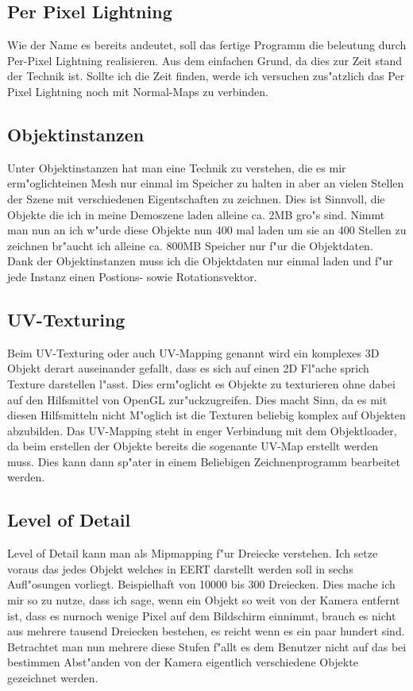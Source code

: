 \documentclass[a4paper,titlepage]{article}
\begin{document}
\subsection{Per Pixel Lightning}
Wie der Name es bereits andeutet, soll das fertige Programm die beleutung durch Per-Pixel Lightning realisieren. Aus dem einfachen Grund, da dies zur Zeit stand der Technik ist. Sollte ich die Zeit finden, werde ich versuchen zus"atzlich das Per Pixel Lightning noch mit Normal-Maps zu verbinden.

\subsection{Objektinstanzen}
Unter Objektinstanzen hat man eine Technik zu verstehen, die es mir erm"oglichteinen Mesh nur einmal im Speicher zu halten in aber an vielen Stellen der Szene mit verschiedenen Eigentschaften zu zeichnen. Dies ist Sinnvoll, die Objekte die ich in meine Demoszene laden alleine ca. 2MB gro"s sind. Nimmt man nun an ich w"urde diese Objekte nun 400 mal laden um sie an 400 Stellen zu zeichnen br"aucht ich alleine ca. 800MB Speicher nur f"ur die Objektdaten.\\
Dank der Objektinstanzen muss ich die Objektdaten nur einmal laden und f"ur jede Instanz einen Postions- sowie Rotationsvektor.

\subsection{UV-Texturing}
Beim UV-Texturing oder auch UV-Mapping genannt wird ein komplexes 3D Objekt derart auseinander gefallt, dass es sich auf einen 2D Fl"ache sprich Texture darstellen l"asst. Dies erm"oglicht es Objekte zu texturieren ohne dabei auf den Hilfsmittel von OpenGL zur"uckzugreifen. Dies macht Sinn, da es mit diesen Hilfsmitteln nicht M"oglich ist die Texturen beliebig komplex auf Objekten abzubilden. Das UV-Mapping steht in enger Verbindung mit dem Objektloader, da beim erstellen der Objekte bereits die sogenante UV-Map erstellt werden muss. Dies kann dann sp"ater in einem Beliebigen Zeichnenprogramm bearbeitet werden.

\subsection{Level of Detail}
Level of Detail kann man als Mipmapping f"ur Dreiecke verstehen. Ich setze voraus das jedes Objekt welches in EERT darstellt werden soll in sechs Aufl"osungen vorliegt. Beispielhaft von 10000 bis 300 Dreiecken. Dies mache ich mir so zu nutze, dass ich sage, wenn ein Objekt so weit von der Kamera entfernt ist, dass es nurnoch wenige Pixel auf dem Bildschirm einnimmt, brauch es nicht aus mehrere tausend Dreiecken bestehen, es reicht wenn es ein paar hundert sind.
Betrachtet man nun mehrere diese Stufen f"allt es dem Benutzer nicht auf das bei bestimmen Abst"anden von der Kamera eigentlich verschiedene Objekte gezeichnet werden.
\end{document}
